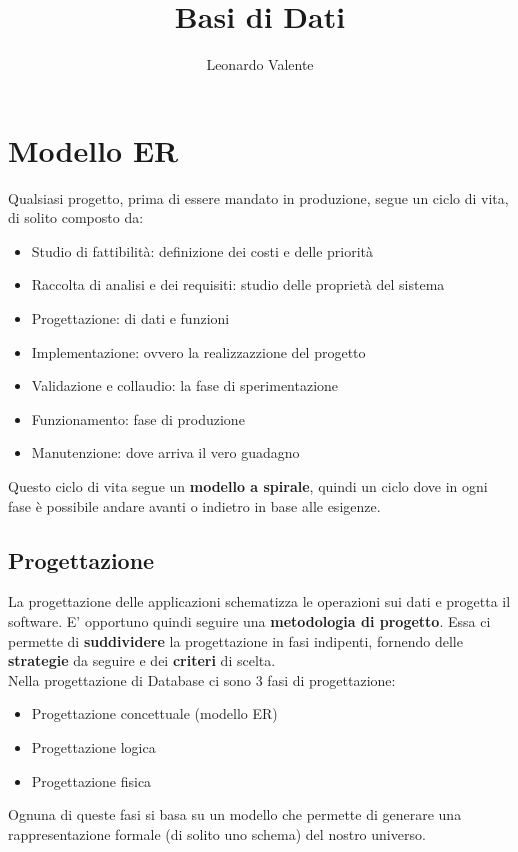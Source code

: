 \documentclass[12pt, a4paper]{article}
\author{Leonardo Valente}
\title{Basi di Dati}
\begin{document}
    \maketitle

    \section{Modello ER}
    Qualsiasi progetto, prima di essere mandato in produzione, segue un ciclo di vita, di solito composto da:

    \begin{itemize}
        \item Studio di fattibilità: definizione dei costi e delle priorità
        \item Raccolta di analisi e dei requisiti: studio delle proprietà del sistema
        \item Progettazione: di dati e funzioni
        \item Implementazione: ovvero la realizzazzione del progetto
        \item Validazione e collaudio: la fase di sperimentazione
        \item Funzionamento: fase di produzione
        \item Manutenzione: dove arriva il vero guadagno
    \end{itemize}

    Questo ciclo di vita segue un \textbf{modello a spirale}, quindi un ciclo dove in ogni fase è possibile
    andare avanti o indietro in base alle esigenze.

    \subsection{Progettazione}
    La progettazione delle applicazioni schematizza le operazioni sui dati e progetta il software.
    E' opportuno quindi seguire una \textbf{metodologia di progetto}.
    Essa ci permette di \textbf{suddividere} la progettazione in fasi indipenti,
    fornendo delle \textbf{strategie} da seguire e dei \textbf{criteri} di scelta.
    \\
    Nella progettazione di Database ci sono 3 fasi di progettazione: 
    \begin{itemize}
        \item Progettazione concettuale (modello ER)
        \item Progettazione logica
        \item Progettazione fisica
    \end{itemize}
    Ognuna di queste fasi si basa su un modello che permette di generare una rappresentazione
    formale (di solito uno schema) del nostro universo.
    
\end{document}
